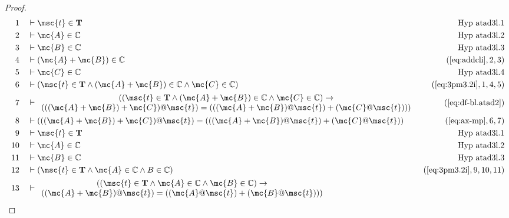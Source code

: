 \begin{proof}
\begin{align}
  1 &&  & \vdash \msc{t} \in \mathbf{T}&\text{Hyp~atad3l.1}\notag%
  \\ 2 &&  & \vdash \mc{A} \in \mathbb{C}&\text{Hyp~atad3l.2}\notag%
  \\ 3 &&  & \vdash \mc{B} \in \mathbb{C}&\text{Hyp~atad3l.3}\notag%
  \\ 4 &&  & \vdash ( \mc{A} + \mc{B} ) \in \mathbb{C}&(\mbox{\ref{eq:addcli}},2,3)\notag
  \\ 5 &&  & \vdash \mc{C} \in \mathbb{C}&\text{Hyp~atad3l.4}\notag%
  \\ 6 &&  & \vdash ( \msc{t} \in \mathbf{T} \wedge ( \mc{A} + \mc{B} ) \in \mathbb{C}
     \wedge \mc{C} \in \mathbb{C}
     )&(\mbox{\ref{eq:3pm3.2i}},1,4,5)\notag
  \\ 7 &&  & \vdash 
     \begin{array}{c}
     ( ( \msc{t} \in \mathbf{T} \wedge ( \mc{A} + \mc{B} ) \in \mathbb{C}
     \wedge \mc{C} \in \mathbb{C} ) \rightarrow \notag \\
      ( ( ( \mc{A} + \mc{B} ) +
     \mc{C} ) @ \msc{t} ) = ( ( ( \mc{A} + \mc{B} ) @ \msc{t} ) + ( \mc{C} @
     \msc{t} ) ) )
     \end{array}
     &(\mbox{\ref{eq:df-bl.atad2}})\notag
  \\ 8 &&  & \vdash ( ( ( \mc{A} + \mc{B} ) + \mc{C} ) @ \msc{t} ) = ( ( ( \mc{A} + \mc{B} ) @ \msc{t} )
     + ( \mc{C} @ \msc{t} ) )&(\mbox{\ref{eq:ax-mp}},6,7)\notag
  \\ 9 &&  & \vdash \msc{t} \in
     \mathbf{T}&\text{Hyp~atad3l.1}\notag%
  \\ 10 &&  & \vdash \mc{A} \in \mathbb{C}&\text{Hyp~atad3l.2}\notag%
  \\ 11 &&  & \vdash \mc{B} \in \mathbb{C}&\text{Hyp~atad3l.3}\notag%
  \\ 12 &&  & \vdash ( \msc{t} \in \mathbf{T} \wedge \mc{A} \in \mathbb{C} \wedge B
     \in \mathbb{C}
     )&(\mbox{\ref{eq:3pm3.2i}},9,10,11)\notag
  \\ 13 &&  & \vdash 
     \begin{array}{c}
     ( ( \msc{t} \in \mathbf{T} \wedge \mc{A} \in \mathbb{C} \wedge
     \mc{B} \in \mathbb{C} ) \rightarrow \notag \\
      ( ( \mc{A} + \mc{B} ) @ \msc{t}
     ) = ( ( \mc{A} @ \msc{t} ) + ( \mc{B} @ \msc{t} ) )
     )
     \end{array}

\end{align}
\end{proof}
